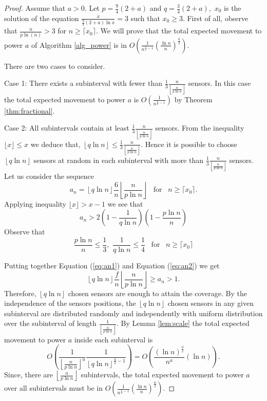 \documentclass[final,5p,times,twocolumn]{elsarticle_mod}
\begin{document}
\begin{proof} Assume that $a>0.$
Let $p=\frac{9}{4}(2+a)$ and  $q=\frac{3}{4}(2+a),$ 
$x_0$ is the solution of the equation $\frac{x}{\frac{9}{4}(2+a)\ln x}=3$ such that $x_0\ge 3.$
First of all, observe that $\frac{n}{p\ln (n)}> 3$ for $n\ge \lceil x_0\rceil .$
We will prove that the total expected movement to power $a$ of Algorithm \ref{alg_power}
is in $O\left(\frac{1}{n^{\frac{a}{2}-1}}(\frac{\ln n}{n})^{\frac{a}{2}}\right).$

There are two cases to consider.

Case 1: There exists a subinterval with fewer than 
$\frac{1}{3}\frac{n}{\left\lfloor\frac{n}{p\ln n}\right\rfloor}$
sensors. In this case the total expected movement to power $a$ is 
$O\left(\frac{1}{n^{\frac{a}{2}-1}}\right)$ by Theorem \ref{thm:fractional}.

Case 2:  All subintervals contain at least $\frac{1}{3}\frac{n}{\left\lfloor\frac{n}{p\ln n}\right\rfloor}$ sensors. From the inequality 
$\lfloor x\rfloor \le x$
we deduce that, 
$\left\lfloor q\ln n\right\rfloor\le\frac{1}{3}\frac{n}{\left\lfloor\frac{n}{p\ln n}\right\rfloor}.$
Hence it is possible to choose $\left\lfloor q\ln n \right\rfloor$ sensors at random in each subinterval
with more than 
$\frac{1}{3}\frac{n}{\left\lfloor\frac{n}{p\ln n}\right\rfloor}$
sensors. 
Let us consider the sequence
$$a_n=\left\lfloor q\ln n\right\rfloor \frac{6}{n} \left\lfloor\frac{n}{p\ln n}\right\rfloor
\,\,\,\,\,
\text{for}\,\,\,\,\, n\ge \lceil x_0\rceil.$$
Applying inequality $\lfloor x\rfloor>x-1$ we see that
\begin{equation}
\label{eq:an1}
a_n>2\left(1-\frac{1}{q\ln n}\right)  \left(1-\frac{p\ln n}{n}\right)
\end{equation}
Observe that
\begin{equation}
\label{eq:an2}
\frac{p\ln n}{n} \le \frac{1}{3},\,\, \frac{1}{q\ln n}\le \frac{1}{4}\,\,\,\,\,\text{for}\,\,\,\,\, n\ge \lceil x_0\rceil
\end{equation}

Putting together Equation (\ref{eq:an1}) and Equation (\ref{eq:an2}) we get
$$\left\lfloor q\ln n \right\rfloor \frac{f}{n} \left\lfloor\frac{n}{p\ln n}\right\rfloor\ge a_n> 1.$$
Therefore, $\left\lfloor q\ln n \right\rfloor$ 
chosen sensors are enough to attain the coverage.
By the independence of the sensors positions, the $\left\lfloor q\ln n \right\rfloor$ 
chosen sensors in any given subinterval are distributed randomly and independently with uniform distribution over the subinterval of length
$\frac{1}{\left\lfloor \frac{n}{p\ln n}\right\rfloor}.$
By Lemma \ref{lem:scale} the total expected movement to power $a$ inside each subinterval is 
$$O\left(\frac{1}{\left\lfloor \frac{n}{p\ln n}\right\rfloor^a}\frac{1}{\left\lfloor q\ln n\right\rfloor^{\frac{a}{2}-1}}\right)=
O\left(\frac{(\ln n)^{\frac{a}{2}}}{n^{a}}(\ln n)\right).$$
Since, there are $\left\lfloor\frac{n}{p\ln n}\right\rfloor$ subintervals, the total expected movement to power $a$ over all subintervals must be in
$O\left(\frac{1}{n^{\frac{a}{2}-1}}\left(\frac{\ln n}{n}\right)^{\frac{a}{2}}\right).$


\end{proof}
\end{document}
